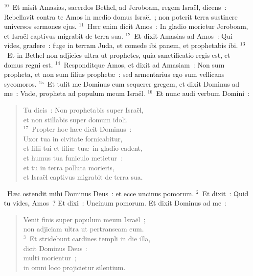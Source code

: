 ${}^{10}$~Et misit Amasias, sacerdos Bethel, ad Jeroboam, regem Isra\"el, dicens~: Rebellavit contra te Amos in medio domus Isra\"el~; non poterit terra sustinere universos sermones ejus.
${}^{11}$~H\ae c enim dicit Amos~: In gladio morietur Jeroboam, et Isra\"el captivus migrabit de terra sua.
${}^{12}$~Et dixit Amasias ad Amos~: Qui vides, gradere~: fuge in terram Juda, et comede ibi panem, et prophetabis ibi.
${}^{13}$~Et in Bethel non adjicies ultra ut prophetes, quia sanctificatio regis est, et domus regni est.
${}^{14}$~Responditque Amos, et dixit ad Amasiam~: Non sum propheta, et non sum filius prophet\ae~: sed armentarius ego sum vellicans sycomoros.
${}^{15}$~Et tulit me Dominus cum sequerer gregem, et dixit Dominus ad me~: Vade, propheta ad populum meum Isra\"el.
${}^{16}$~Et nunc audi verbum Domini~: \begin{flushleft}\begin{verse}Tu dicis~: Non prophetabis super Isra\"el,\\ et non stillabis super domum idoli.\\
${}^{17}$~Propter hoc h\ae c dicit Dominus~:\\ Uxor tua in civitate fornicabitur,\\ et filii tui et fili\ae\ tu\ae\ in gladio cadent,\\ et humus tua funiculo metietur~:\\ et tu in terra polluta morieris,\\ et Isra\"el captivus migrabit de terra sua.\end{verse}\end{flushleft}


~H\ae c ostendit mihi Dominus Deus~: et ecce uncinus pomorum.
${}^{2}$~Et dixit~: Quid tu vides, Amos~? Et dixi~: Uncinum pomorum. Et dixit Dominus ad me~: \begin{flushleft}\begin{verse}Venit finis super populum meum Isra\"el~;\\ non adjiciam ultra ut pertranseam eum.\\
${}^{3}$~Et stridebunt cardines templi in die illa,\\ dicit Dominus Deus~:\\ multi morientur~;\\ in omni loco projicietur silentium.\end{verse}\end{flushleft}


